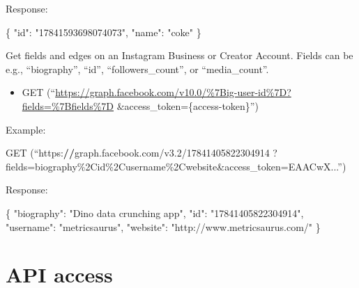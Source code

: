 \documentclass[
]{book}
\newenvironment{Shaded}{\begin{snugshade}}{\end{snugshade}}
\newcommand{\AttributeTok}[1]{\textcolor[rgb]{0.77,0.63,0.00}{#1}}
\newcommand{\DecValTok}[1]{\textcolor[rgb]{0.00,0.00,0.81}{#1}}
\newcommand{\ErrorTok}[1]{\textcolor[rgb]{0.64,0.00,0.00}{\textbf{#1}}}
\newcommand{\FloatTok}[1]{\textcolor[rgb]{0.00,0.00,0.81}{#1}}
\newcommand{\FunctionTok}[1]{\textcolor[rgb]{0.00,0.00,0.00}{#1}}
\newcommand{\NormalTok}[1]{#1}
\newcommand{\SpecialCharTok}[1]{\textcolor[rgb]{0.00,0.00,0.00}{#1}}
\newcommand{\StringTok}[1]{\textcolor[rgb]{0.31,0.60,0.02}{#1}}
\providecommand{\tightlist}{%
  \setlength{\itemsep}{0pt}\setlength{\parskip}{0pt}}
\begin{document}
Response:

\begin{Shaded}
\begin{Highlighting}[]
\NormalTok{\{ }\StringTok{"id"}\SpecialCharTok{:} \StringTok{"17841593698074073"}\NormalTok{,}
  \StringTok{"name"}\SpecialCharTok{:} \StringTok{"coke"}\NormalTok{ \}}
\end{Highlighting}
\end{Shaded}

Get fields and edges on an Instagram Business or Creator Account. Fields can be e.g., ``biography'', ``id'', ``followers\_count'', or ``media\_count''.

\begin{itemize}
\tightlist
\item
  GET (``\url{https://graph.facebook.com/v10.0/\%7Big-user-id\%7D?fields=\%7Bfields\%7D} \&access\_token=\{access-token\}'')
\end{itemize}

Example:

\begin{Shaded}
\begin{Highlighting}[]
\FunctionTok{GET}\NormalTok{ (“https}\SpecialCharTok{:}\ErrorTok{//}\NormalTok{graph.facebook.com}\SpecialCharTok{/}\NormalTok{v3}\FloatTok{.2}\SpecialCharTok{/}\DecValTok{17841405822304914}
\NormalTok{      ?}\AttributeTok{fields=}\NormalTok{biography}\SpecialCharTok{\%2Cid\%}\NormalTok{2Cusername\%2Cwebsite}\SpecialCharTok{\&}\AttributeTok{access\_token=}\NormalTok{EAACwX...”)}
\end{Highlighting}
\end{Shaded}

Response:

\begin{Shaded}
\begin{Highlighting}[]
\NormalTok{\{  }\StringTok{"biography"}\SpecialCharTok{:} \StringTok{"Dino data crunching app"}\NormalTok{,}
  \StringTok{"id"}\SpecialCharTok{:} \StringTok{"17841405822304914"}\NormalTok{,}
  \StringTok{"username"}\SpecialCharTok{:} \StringTok{"metricsaurus"}\NormalTok{,}
  \StringTok{"website"}\SpecialCharTok{:} \StringTok{"http://www.metricsaurus.com/"}\NormalTok{ \}}
\end{Highlighting}
\end{Shaded}

\hypertarget{api-access-5}{%
\section{API access}\label{api-access-5}}
\end{document}
